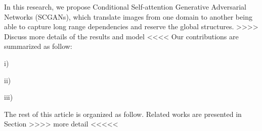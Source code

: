 In this research, we propose Conditional Self-attention Generative Adversarial Networks (SCGANs), which translate images from one domain to another being able to capture long range dependencies and reserve the global structures. >>>> Discuss more details of the results and model <<<< Our contributions are summarized as follow:

i) 

ii)

iii)

The rest of this article is organized as follow. Related works are presented in Section >>>> more detail <<<<<
